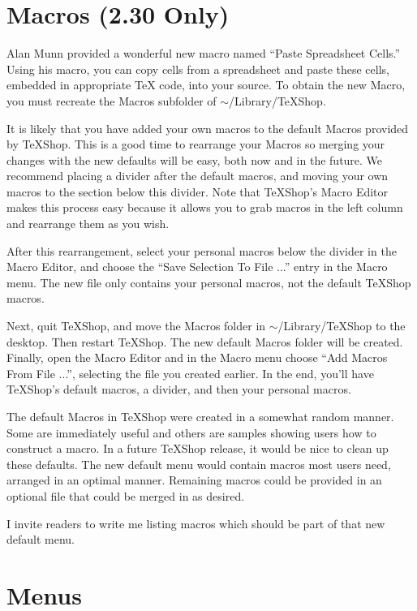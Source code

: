 \documentclass[11pt, oneside]{amsart}
\begin{document}
\section{Macros (2.30 Only)}

Alan Munn provided a wonderful new macro named ``Paste Spreadsheet Cells.'' Using his macro, you can copy cells from a spreadsheet and paste these cells, embedded in appropriate TeX code, into your source. To obtain the new Macro, you must recreate the Macros subfolder of $\sim$/Library/TeXShop.

It is likely that you have added your own macros to the default Macros provided by TeXShop. This is a good time to rearrange your Macros so merging your changes with the new defaults will be easy, both now and in the future. We recommend placing a divider after the default macros, and moving your own macros to the section below this divider. Note that TeXShop's Macro Editor makes this process easy because it allows you to grab macros in the left column and rearrange them as you wish.

After this rearrangement, select your personal macros below the divider in the Macro Editor, and choose the  ``Save Selection To File ...'' entry in the Macro menu. The new file only contains your personal macros, not the default TeXShop macros.

Next, quit TeXShop, and move the Macros folder in $\sim$/Library/TeXShop to the desktop. Then restart TeXShop. The new default Macros folder will be created. Finally, open the Macro Editor and in the Macro menu choose ``Add Macros From File ...'', selecting the file you created earlier. In the end, you'll have TeXShop's default macros, a divider, and then your personal macros.

The default Macros in TeXShop were created in a somewhat random manner. Some are immediately useful and others are samples showing users how to construct a macro. In a future TeXShop release, it would be nice to clean up these defaults. The new default menu would contain macros most users need, arranged in an optimal manner. Remaining macros could be provided in an optional file that could be merged in as desired.

I invite readers to write me listing macros which should be part of that new default menu. 

\section{Menus}
\end{document}
